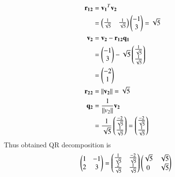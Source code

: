 \begin{enumerate}
\begin{align}
    \\
    \mathbf{r_1{}_2}&=\mathbf{v_1}^{T}{\mathbf{v_2}} 
    \\
    &=\begin{pmatrix}\frac{1}{\sqrt{5}} & \frac{1}{\sqrt{5}}\end{pmatrix}\begin{pmatrix}-1 \\ 3 \end{pmatrix}=\sqrt{5}
    \\
    \mathbf{v_2}&=\mathbf{v_2}-\mathbf{r_1{}_2}\mathbf{q_1} \\
    &=\begin{pmatrix}-1 \\ 3\end{pmatrix}-{\sqrt{5}}\begin{pmatrix}\frac{1}{\sqrt{5}} \\ \frac{1}{\sqrt{5}}\end{pmatrix}
    \\
    &=\begin{pmatrix}-2 \\ 1\end{pmatrix}
    \\
    \mathbf{r_2{}_2}&=\left\lVert\mathbf{v_2}\right\rVert=\sqrt{5}
    \\
    \mathbf{q_2}&=\frac{1}{\left\lVert v_2\right\rVert}\mathbf{v_2}
    \\
    &=\frac{1}{\sqrt{5}}\begin{pmatrix}\frac{-2}{\sqrt{5}} \\ \frac{1}{\sqrt{5}}\end{pmatrix}=\begin{pmatrix}\frac{-2}{\sqrt{5}}\\{\frac{1}{\sqrt{5}}}\end{pmatrix}
    \end{align}
    Thus obtained QR decomposition is 
    \begin{align}
    \begin{pmatrix}1 & -1 \\ 2 & 3\end{pmatrix}=\begin{pmatrix}\frac{1}{\sqrt{5}} & \frac{-2}{\sqrt{5}} \\ \frac{2}{\sqrt{5}} & \frac{1}{\sqrt{5}}\end{pmatrix}\begin{pmatrix}\sqrt{5} & \sqrt{5} \\ 0 & \sqrt{5}\end{pmatrix}
    \end{align}
    \end{enumerate}